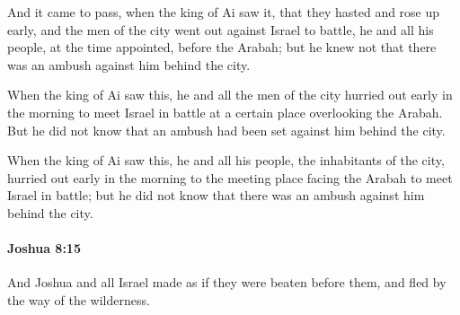 			\begin{versebox}
					\item[BHS] 
					\item[ASV] And it came to pass, when the king of Ai saw it, that they hasted and rose up early, and the men of the city went out against Israel to battle, he and all his people, at the time appointed, before the Arabah; but he knew not that there was an ambush against him behind the city.
					\item[NIV] When the king of Ai saw this, he and all the men of the city hurried out early in the morning to meet Israel in battle at a certain place overlooking the Arabah. But he did not know that an ambush had been set against him behind the city.
					\item[NRSV] When the king of Ai saw this, he and all his people, the inhabitants of the city, hurried out early in the morning to the meeting place facing the Arabah to meet Israel in battle; but he did not know that there was an ambush against him behind the city.
			\end{versebox}

		\paragraph{Joshua 8:15} %
			\label{JOSHUA-8-15}

			And Joshua and all Israel made as if they were beaten before them, and fled by the way of the wilderness.

